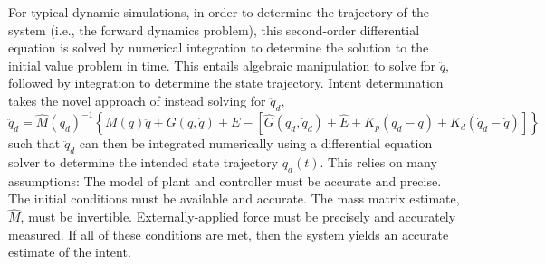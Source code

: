 For typical dynamic simulations, in order to determine the trajectory of the system (i.e., the forward dynamics problem), this second-order differential equation is solved by numerical integration to determine the solution to the initial value problem in time. This entails algebraic manipulation to solve for $\ddot{q}$, followed by integration to determine the state trajectory. Intent determination takes the novel approach of instead solving for $\ddot{q}_d$,
\begin{equation}
\ddot{q}_d=\hat{M}(q_d)^{-1}\left\{M(q)\ddot{q}+G(q,\dot{q})+E-[\hat{G}(q_d,\dot{q}_d)+\hat{E}+K_p(q_d-q)+K_d(\dot{q}_d-\dot{q})]\right\}
\end{equation}  
such that $\ddot{q}_d$ can then be integrated numerically using a differential equation solver to determine the intended state trajectory $q_d(t)$. This relies on many assumptions: The model of plant and controller must be accurate and precise. The initial conditions must be available and accurate. The mass matrix estimate, $\hat{M}$, must be invertible. Externally-applied force must be precisely and accurately measured. If all of these conditions are met, then the system yields an accurate estimate of the intent.


